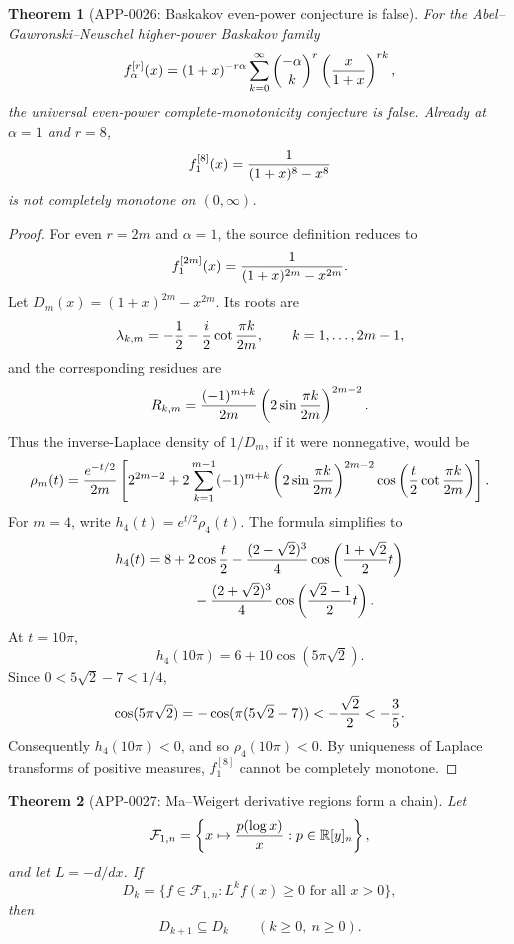 \documentclass[11pt]{article}
\numberwithin{equation}{section}
\newtheorem{theorem}{Theorem}[section]
\theoremstyle{definition}
\theoremstyle{remark}
\newcommand{\1}{\mathbf 1}
\begin{document}
\begin{theorem}[APP-0026: Baskakov even-power conjecture is false]
\label{thm:app26-baskakov-r8}
For the Abel--Gawronski--Neuschel higher-power Baskakov family
\[
 f^{[r]}_\alpha(x)
 =(1+x)^{-r\alpha}\sum_{k=0}^\infty
 \binom{-\alpha}{k}^{r}\left({x\over1+x}\right)^{rk},
\]
the universal even-power complete-monotonicity conjecture is false.  Already
at \(\alpha=1\) and \(r=8\),
\[
 f^{[8]}_1(x)={1\over (1+x)^8-x^8}
\]
is not completely monotone on \((0,\infty)\).
\end{theorem}

\begin{proof}
For even \(r=2m\) and \(\alpha=1\), the source definition reduces to
\[
 f^{[2m]}_1(x)={1\over(1+x)^{2m}-x^{2m}}.
\]
Let \(D_m(x)=(1+x)^{2m}-x^{2m}\).  Its roots are
\[
 \lambda_{k,m}=-{1\over2}-{i\over2}\cot{\pi k\over 2m},
 \qquad k=1,\ldots,2m-1,
\]
and the corresponding residues are
\[
 R_{k,m}={(-1)^{m+k}\over2m}
 \left(2\sin{\pi k\over2m}\right)^{2m-2}.
\]
Thus the inverse-Laplace density of \(1/D_m\), if it were nonnegative, would
be
\[
 \rho_m(t)={e^{-t/2}\over2m}
 \left[
 2^{2m-2}
 +2\sum_{k=1}^{m-1}(-1)^{m+k}
 \left(2\sin{\pi k\over2m}\right)^{2m-2}
 \cos\left({t\over2}\cot{\pi k\over2m}\right)
 \right].
\]
For \(m=4\), write \(h_4(t)=e^{t/2}\rho_4(t)\).  The formula simplifies to
\[
\begin{aligned}
 h_4(t)
 &=8+2\cos{t\over2}
 -{(2-\sqrt2)^3\over4}\cos\left({1+\sqrt2\over2}t\right) \\
 &\hspace{1.2cm}
 -{(2+\sqrt2)^3\over4}\cos\left({\sqrt2-1\over2}t\right).
\end{aligned}
\]
At \(t=10\pi\),
\[
 h_4(10\pi)=6+10\cos(5\pi\sqrt2).
\]
Since \(0<5\sqrt2-7<1/4\),
\[
 \cos(5\pi\sqrt2)=-\cos(\pi(5\sqrt2-7))
 <-{\sqrt2\over2}<-{3\over5}.
\]
Consequently \(h_4(10\pi)<0\), and so \(\rho_4(10\pi)<0\).  By uniqueness of
Laplace transforms of positive measures, \(f^{[8]}_1\) cannot be completely
monotone.
\end{proof}

\begin{theorem}[APP-0027: Ma--Weigert derivative regions form a chain]
\label{thm:app27-ma-weigert-chain}
Let
\[
 \mathcal F_{1,n}
 =
 \left\{x\mapsto {p(\log x)\over x}:p\in\mathbb R[y]_n\right\},
\]
and let \(L=-d/dx\).  If
\[
 D_k=\{f\in\mathcal F_{1,n}:L^kf(x)\ge0\text{ for all }x>0\},
\]
then
\[
 D_{k+1}\subseteq D_k
 \qquad(k\ge0,\ n\ge0).
\]
\end{theorem}
\end{document}
